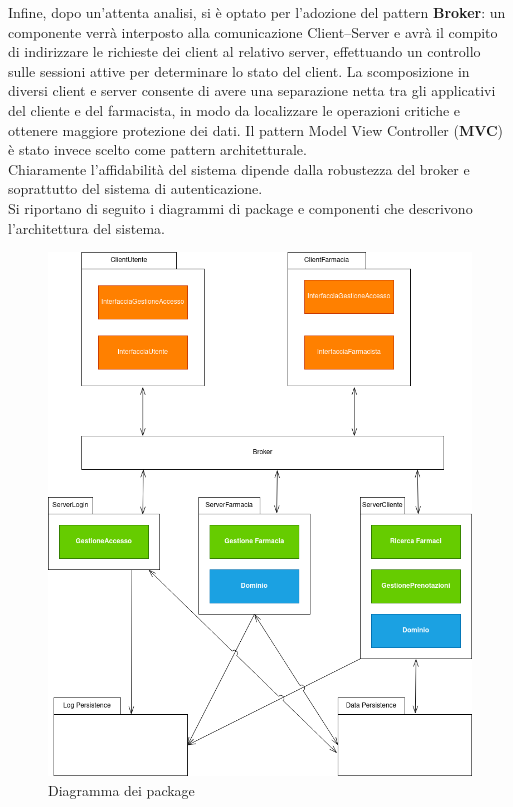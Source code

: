 Infine, dopo un'attenta analisi, si è optato per l'adozione del pattern \textbf{Broker}: 
un componente verrà interposto alla comunicazione Client--Server e avrà il compito di indirizzare le richieste dei client al relativo server, 
effettuando un controllo sulle sessioni attive per determinare lo stato del client. 
La scomposizione in diversi client e server consente di avere una separazione netta tra gli applicativi del cliente e del farmacista, 
in modo da localizzare le operazioni critiche e ottenere maggiore protezione dei dati.
Il pattern Model View Controller (\textbf{MVC}) è stato invece scelto come pattern architetturale.
\\
Chiaramente l'affidabilità del sistema dipende dalla robustezza del broker e soprattutto del sistema di autenticazione.
\\
Si riportano di seguito i diagrammi di package e componenti che descrivono l'architettura del sistema.

\begin{figure}[h]
    \begin{center}
        \includegraphics[scale=0.4]{immagini/Package-progettazione.png}
        \caption{Diagramma dei package}
    \end{center}
\end{figure}

